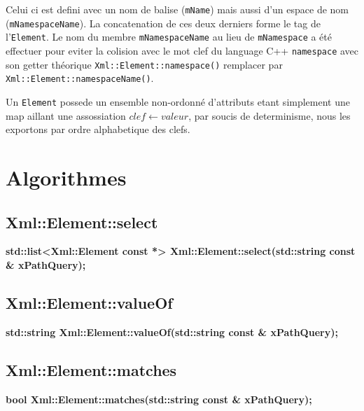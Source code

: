         Celui ci est defini avec un nom de balise (\lstinline$mName$) mais aussi d'un espace de nom (\lstinline$mNamespaceName$). La concatenation de ces deux derniers forme le tag de l'\lstinline$Element$. Le nom du membre \lstinline$mNamespaceName$ au lieu de \lstinline$mNamespace$ a \'et\'e effectuer pour eviter la colision avec le mot clef du language C++ \lstinline$namespace$ avec son getter th\'eorique \lstinline$Xml::Element::namespace()$ remplacer par \lstinline$Xml::Element::namespaceName()$.

        Un \lstinline$Element$ possede un ensemble non-ordonné d'attributs etant simplement une map aillant une assossiation $clef \leftarrow valeur$, par soucis de determinisme, nous les exportons par ordre alphabetique des clefs.

    \section{Algorithmes}

    \subsection{Xml::Element::select}

    \textbf{std::list<Xml::Element const *> Xml::Element::select(std::string const & xPathQuery);}

    \subsection{Xml::Element::valueOf}

    \textbf{std::string Xml::Element::valueOf(std::string const & xPathQuery);}

    \subsection{Xml::Element::matches}

    \textbf{bool Xml::Element::matches(std::string const & xPathQuery);}

